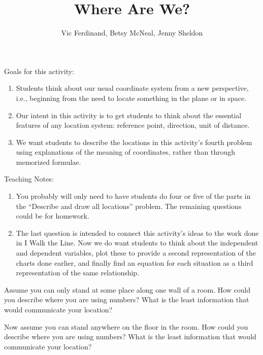\documentclass{ximera}
\title{Where Are We?}
\author{Vic Ferdinand, Betsy McNeal, Jenny Sheldon}
\begin{document}
\begin{abstract}\end{abstract}
\maketitle
\begin{instructorIntro}
Goals for this activity:
\begin{enumerate}
\item Students think about our usual coordinate system from a new perspective, i.e., beginning from the need to locate something in the plane or in space.
\item  Our intent in this activity is to get students to think about the essential features of any location system: reference point, direction, unit of distance.
\item We want students to describe the locations in this activity's fourth problem using explanations of the meaning of coordinates, rather than through memorized formulae.
\end{enumerate}

Teaching Notes:
\begin{enumerate}
\item  You probably will only need to have students do four or five of the parts in the ``Describe and draw all locations'' problem.  The remaining questions could be for homework.
\item  The last question is intended to connect this activity's ideas to the work done in I Walk the Line.  Now we do want students to think about the independent and dependent variables, plot these to provide a second representation of the charts done earlier, and finally find an equation for each situation as a third representation of the same relationship.
\end{enumerate}
\end{instructorIntro}


\begin{problem}
Assume you can only stand at some place along one wall of a room.  How could you describe where you are using numbers?  What is the least information that would communicate your location?

\end{problem}

\begin{problem}
Now assume you can stand anywhere on the floor in the room.  How could you describe where you are using numbers?  What is the least information that would communicate your location?


\end{problem}
\end{document}
